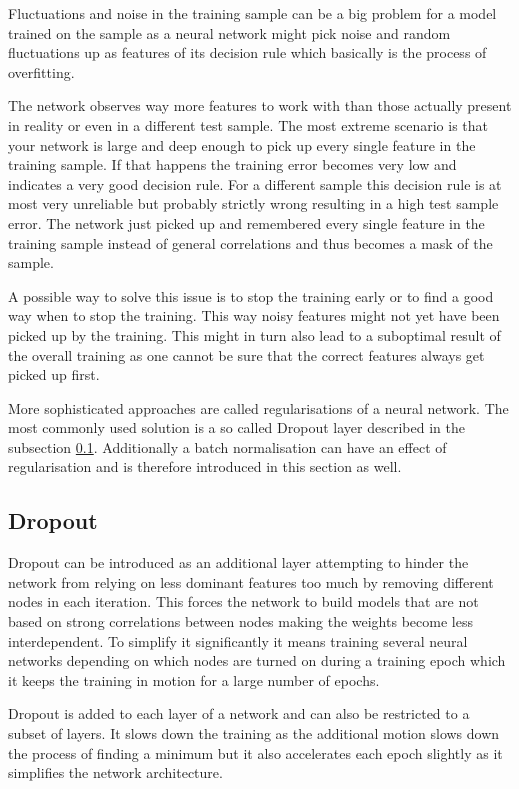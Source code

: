 Fluctuations and noise in the training sample can be a big problem for a model trained on the sample as a neural network might pick noise and random fluctuations up as features of its decision rule which basically is the process of overfitting.

The network observes way more features to work with than those actually present in reality or even in a different test sample. The most extreme scenario is that your network is large and deep enough to pick up every single feature in the training sample. If that happens the training error becomes very low and indicates a very good decision rule. For a different sample this decision rule is at most very unreliable but probably strictly wrong resulting in a high test sample error. The network just picked up and remembered every single feature in the training sample instead of general correlations and thus becomes a mask of the sample.

A possible way to solve this issue is to stop the training early or to find a good way when to stop the training. This way noisy features might not yet have been picked up by the training. This might in turn also lead to a suboptimal result of the overall training as one cannot be sure that the correct features always get picked up first.

More sophisticated approaches are called regularisations of a neural network. The most commonly used solution is a so called Dropout layer described in the subsection \ref{sec:dropout}. Additionally a batch normalisation can have an effect of regularisation and is therefore introduced in this section as well.

\subsection{Dropout}
\label{sec:dropout}

Dropout can be introduced as an additional layer attempting to hinder the network from relying on less dominant features too much by removing different nodes in each iteration. This forces the network to build models that are not based on strong correlations between nodes making the weights become less interdependent. To simplify it significantly it means training several neural networks depending on which nodes are turned on during a training epoch which it keeps the training in motion for a large number of epochs.

Dropout is added to each layer of a network and can also be  restricted to a subset of layers. It slows down the training as the additional motion slows down the process of finding a minimum but it also accelerates each epoch slightly as it simplifies the network architecture. 

